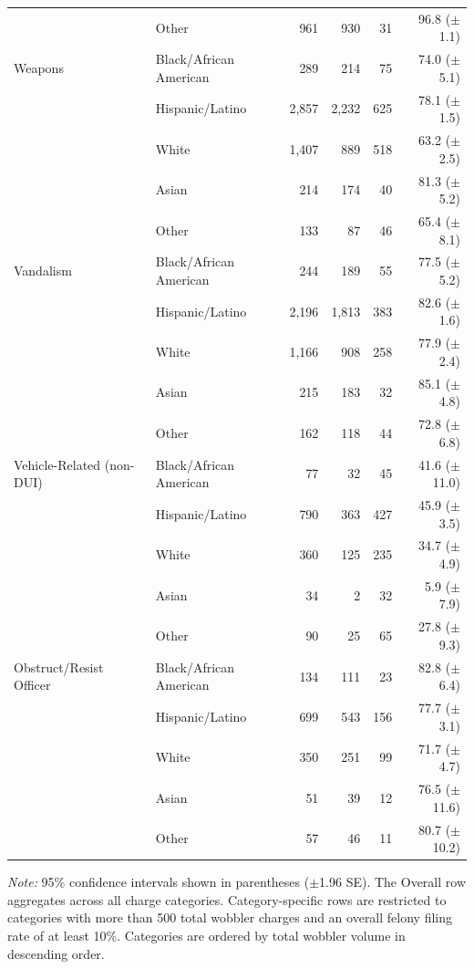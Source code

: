\begin{table}[htbp]
\begin{tabular}{ll rrrr}
 & Other & 961 & 930 & 31 & 96.8 ({\scriptsize $\pm$1.1}) \\
\addlinespace
\midrule
Weapons & Black/African American & 289 & 214 & 75 & 74.0 ({\scriptsize $\pm$5.1}) \\
 & Hispanic/Latino & 2,857 & 2,232 & 625 & 78.1 ({\scriptsize $\pm$1.5}) \\
 & White & 1,407 & 889 & 518 & 63.2 ({\scriptsize $\pm$2.5}) \\
 & Asian & 214 & 174 & 40 & 81.3 ({\scriptsize $\pm$5.2}) \\
 & Other & 133 & 87 & 46 & 65.4 ({\scriptsize $\pm$8.1}) \\
\addlinespace
\midrule
Vandalism & Black/African American & 244 & 189 & 55 & 77.5 ({\scriptsize $\pm$5.2}) \\
 & Hispanic/Latino & 2,196 & 1,813 & 383 & 82.6 ({\scriptsize $\pm$1.6}) \\
 & White & 1,166 & 908 & 258 & 77.9 ({\scriptsize $\pm$2.4}) \\
 & Asian & 215 & 183 & 32 & 85.1 ({\scriptsize $\pm$4.8}) \\
 & Other & 162 & 118 & 44 & 72.8 ({\scriptsize $\pm$6.8}) \\
\addlinespace
\midrule
Vehicle-Related (non-DUI) & Black/African American & 77 & 32 & 45 & 41.6 ({\scriptsize $\pm$11.0}) \\
 & Hispanic/Latino & 790 & 363 & 427 & 45.9 ({\scriptsize $\pm$3.5}) \\
 & White & 360 & 125 & 235 & 34.7 ({\scriptsize $\pm$4.9}) \\
 & Asian & 34 & 2 & 32 & 5.9 ({\scriptsize $\pm$7.9}) \\
 & Other & 90 & 25 & 65 & 27.8 ({\scriptsize $\pm$9.3}) \\
\addlinespace
\midrule
Obstruct/Resist Officer & Black/African American & 134 & 111 & 23 & 82.8 ({\scriptsize $\pm$6.4}) \\
 & Hispanic/Latino & 699 & 543 & 156 & 77.7 ({\scriptsize $\pm$3.1}) \\
 & White & 350 & 251 & 99 & 71.7 ({\scriptsize $\pm$4.7}) \\
 & Asian & 51 & 39 & 12 & 76.5 ({\scriptsize $\pm$11.6}) \\
 & Other & 57 & 46 & 11 & 80.7 ({\scriptsize $\pm$10.2}) \\
\bottomrule
\end{tabular}
\smallskip
\parbox{\textwidth}{\footnotesize \textit{Note:} 95\% confidence intervals shown in parentheses ($\pm$1.96 SE). The Overall row aggregates across all charge categories. Category-specific rows are restricted to categories with more than 500 total wobbler charges and an overall felony filing rate of at least 10\%. Categories are ordered by total wobbler volume in descending order.}
\end{table}